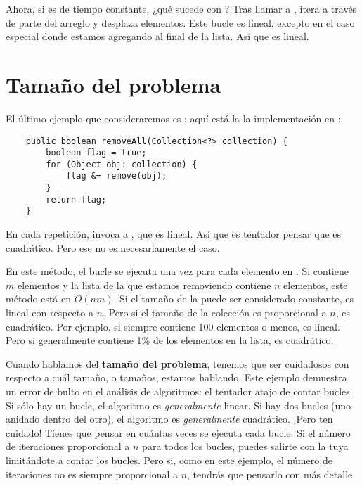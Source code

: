 \documentclass[12pt]{book}
\theoremstyle{exercise}
\begin{document}
Ahora, si  es de tiempo constante, ¿qué sucede con
? Tras llamar a , itera a través de
parte del arreglo y desplaza elementos. Este bucle es lineal, excepto
en el caso especial donde estamos agregando al final de la lista. Así
que  es lineal.



\section{Tamaño del problema}
\label{classifying-removeall}

El último ejemplo que consideraremos es ; aquí está la
la implementación en :

\begin{verbatim}
    public boolean removeAll(Collection<?> collection) {
        boolean flag = true;
        for (Object obj: collection) {
            flag &= remove(obj);
        }
        return flag;
    }
\end{verbatim}

En cada repetición,  invoca a ,
que es lineal.  Así que es tentador pensar que  es
cuadrático.  Pero ese no es necesariamente el caso.


En este método, el bucle se ejecuta una vez para cada elemento en
. Si  contiene $m$ elementos y la
lista de la que estamos removiendo contiene $n$ elementos, este método está en
$O(nm)$. Si el tamaño de la  puede ser considerado constante,
 es lineal con respecto a $n$. Pero si el tamaño de la
colección es proporcional a $n$,  es cuadrático. Por ejemplo,
si  siempre contiene 100 elementos o menos,
 es lineal. Pero si  generalmente
contiene 1\% de los elementos en la lista,  es
cuadrático.


Cuando hablamos del {\bf tamaño del problema}, tenemos que ser cuidadosos con
respecto a cuál tamaño, o tamaños, estamos hablando. Este ejemplo demuestra
un error de bulto en el análisis de algoritmos: el tentador atajo de contar
bucles. Si sólo hay un bucle, el algoritmo es \emph{generalmente}
linear.  Si hay dos bucles (uno anidado dentro del otro), el algoritmo es
\emph{generalmente} cuadrático. ¡Pero ten cuidado! Tienes que pensar
en cuántas veces se ejecuta cada bucle. Si el número de iteraciones
proporcional a $n$ para todos los bucles, puedes salirte con la tuya limitándote
a contar los bucles. Pero si, como en este ejemplo, el número de iteraciones no es
siempre proporcional a $n$, tendrás que pensarlo con más detalle.
\end{document}
